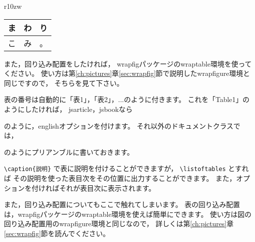 \begin{wraptable}{r}{10zw}
\vspace*{-\intextsep}
\begin{tabular}{|c|c|c|} \hline
ま & わ & り \\ \hline
こ & み & 。\\ \hline
\end{tabular}
\end{wraptable}

また，回り込み配置をしたければ，
wrapfigパッケージのwraptable環境を使ってください。
使い方は第\ref{ch:pictures}章\ref{sec:wrapfig}節で説明したwrapfigure環境と同じですので，
そちらを見て下さい。

表の番号は自動的に「表1」，「表2」，...のように付きます。
これを「Table1」のようにしたければ，
jsarticle，jsbookなら
のように，englishオプションを付けます。
それ以外のドキュメントクラスでは，
\begin{ITeX}
\renewcommand{\tablename}{Table}
\end{ITeX}
のようにプリアンブルに書いておきます。

\verb|\caption{説明}| で表に説明を付けることができますが，
\verb|\listoftables| とすれば
その説明を使った表目次をその位置に出力することができます。
また，オプションを付ければそれが表目次に表示されます。

また，回り込み配置についてもここで触れてしまいます。
表の回り込み配置は，wrapfigパッケージのwraptable環境を使えば簡単にできます。
使い方は図の回り込み配置用のwrapfigure環境と同じなので，
詳しくは第\ref{ch:pictures}章\ref{sec:wrapfig}節を読んでください。


